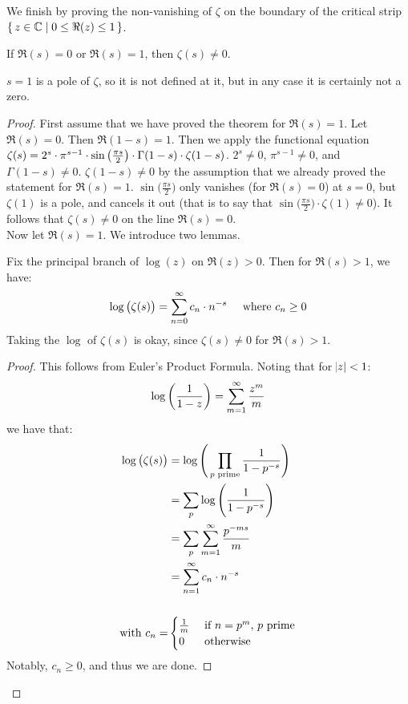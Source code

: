 We finish by proving the non-vanishing of $\zeta$ on the boundary of the critical strip $\set{z \in \mathbb{C}\mid 0 \leq \Re(z) \leq 1}$.

\begin{theorem}
If $\Re(s) = 0$ or $\Re(s) = 1$, then $\zeta(s) \neq 0$.
\end{theorem}
\begin{note}
$s=1$ is a pole of $\zeta$, so it is not defined at it, but in any case it is certainly not a zero.
\end{note}
\begin{proof}
First assume that we have proved the theorem for $\Re(s) = 1$. Let $\Re(s) = 0$. Then $\Re(1-s) = 1$. Then we apply the functional equation $\zeta(s) = 2^s \cdot \pi^{s-1} \cdot \sin\left( \frac{\pi s}{2} \right) \cdot \Gamma(1-s) \cdot \zeta(1-s)$. $2^s \neq 0$, $\pi^{s-1} \neq 0$, and $\Gamma(1-s) \neq 0$. $\zeta(1-s) \neq 0$ by the assumption that we already proved the statement for $\Re(s)=1$. $\sin \big( \frac{\pi s}{2} \big)$ only vanishes (for $\Re(s) = 0$) at $s=0$, but $\zeta(1)$ is a pole, and cancels it out (that is to say that $\sin \big( \frac{\pi s}{2} \big) \cdot \zeta(1) \neq 0$). It follows that $\zeta(s) \neq 0$ on the line $\Re(s) = 0$.\\

Now let $\Re(s) = 1$. We introduce two lemmas.
\begin{lemma}
Fix the principal branch of $\log(z)$ on $\Re(z) > 0$. Then for $\Re(s) > 1$, we have:
\begin{align*}
    \log\left( \zeta(s) \right) = \sum_{n=0}^\infty c_n \cdot n^{-s} \;\;\;\;\; \text{where $c_n \geq 0$}
\end{align*}
Taking the $\log$ of $\zeta(s)$ is okay, since $\zeta(s) \neq 0$ for $\Re(s) > 1$.
\end{lemma}
\begin{proof}
This follows from Euler's Product Formula.
Noting that for $\abs{z} < 1$:
\begin{align*}
    \log \left(  \frac{1}{1-z} \right) = \sum_{m=1}^\infty \frac{z^m}{m}
\end{align*}
we have that:
\begin{align*}
    \log\left( \zeta(s)  \right) &= \log  \Bigg( \prod_{p \text{ prime} } \frac{1}{1-p^{-s}} \Bigg) \\&= \sum_{p } \log \Bigg( \frac{1}{1-p^{-s}}\Bigg) \\&= \sum_{p } \sum_{m=1}^\infty \frac{p^{-ms}}{m} \\&= \sum_{n=1}^\infty c_n \cdot n^{-s}\\\\
    \text{with }c_n = &\begin{cases} \frac{1}{m} &\text{ if $n=p^m$, $p$ prime} \\ 0 &\text{ otherwise}\end{cases}
\end{align*}
Notably, $c_n \geq 0$, and thus we are done.
\end{proof}


\end{proof}
